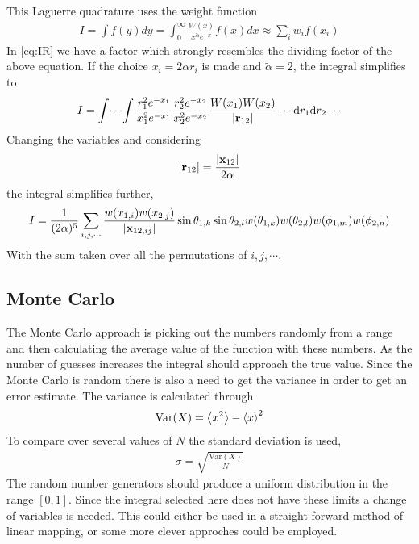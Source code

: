 \documentclass[11pt,a4paper,english,final]{article}
\numberwithin{equation}{section}
\newcommand{\ve}[1]{\mathbf{#1}} %
\newcommand{\di}{\mathrm{d}}
\begin{document}
This Laguerre quadrature uses the weight function
\begin{gather}
I = \int f(y) dy = \int_0^\infty \frac{W(x)}{x^{\tilde{\alpha}} e^{-x}} f(x) dx
\approx \sum_i w_i f(x_i)
\end{gather}
In \eqref{eq:IR} we have a factor which strongly resembles the dividing 
factor of the above equation. If the choice $x_i = 2\alpha r_i$ is made 
and $\tilde{\alpha} = 2$,
the integral simplifies to 
\begin{gather}
I = \int\!\cdots\!\int \frac{r_1^2e^{-x_1}}{x_1^2e^{-x_1}}
\frac{r_2^2e^{-x_2}}{x_2^2e^{-x_2}} 
\frac{W(x_1)W(x_2)}{\abs{\ve{r}_{12}}} \cdots
\di r_1 \di r_2 \cdots
\end{gather}
Changing the variables and considering 
\begin{gather}
\abs{\ve{r}_{12}} = \frac{\abs{\ve{x}_{12}}}{2\alpha}
\end{gather}
the integral simplifies further,
\begin{gather}
\nonumber I = 
\frac{1}{(2\alpha)^5}\sum_{i, j, \cdots} 
\frac{w(x_{1,i})w(x_{2,j})}{\abs{\ve{x}_{12,ij}}} 
\sin\theta_{1,k} \sin\theta_{2,l} w(\theta_{1,k}) w(\theta_{2,l})
w(\phi_{1,m}) w(\phi_{2,n})
\end{gather}
With the sum taken over all the permutations of $i,j, \cdots$.



\subsection{Monte Carlo}

The Monte Carlo approach is picking out the numbers randomly from a range
and then 
calculating the average value of the function with these numbers.
As the number of guesses 
increases the integral should approach the true value. Since the Monte 
Carlo is random there is also a need to get the variance in order 
to get an error estimate. The variance is calculated through
\begin{gather}
\mathrm{Var}(X) = \expval{x^2} - \expval{x}^2
\end{gather}
To compare over several values of $N$ the standard deviation is used,
\begin{gather}
\sigma = \sqrt{\frac{\mathrm{Var}(X)}{N}}
\end{gather}
The random number generators should produce a uniform distribution
in the range $[0,1]$. Since the integral selected here does not have these 
limits a change of variables is needed. This could either be used in a 
straight forward method of linear mapping, 
or some more clever approches could be employed.
\end{document}
